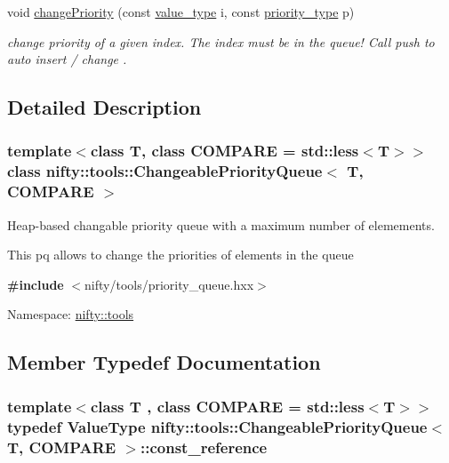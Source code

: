 \begin{DoxyCompactItemize}
void \hyperlink{classnifty_1_1tools_1_1ChangeablePriorityQueue_a5db5d4bd2d451623897e27c1aa5f8fff}{change\+Priority} (const \hyperlink{classnifty_1_1tools_1_1ChangeablePriorityQueue_aa00fbc748b94bdc6175b4c49bb2bba48}{value\+\_\+type} i, const \hyperlink{classnifty_1_1tools_1_1ChangeablePriorityQueue_a6ecafb387f99a1cfa7ff5795c924682c}{priority\+\_\+type} p)
\begin{DoxyCompactList}\small\item\em change priority of a given index. The index must be in the queue! Call push to auto insert / change . \end{DoxyCompactList}\end{DoxyCompactItemize}


\subsection{Detailed Description}
\subsubsection*{template$<$class T, class C\+O\+M\+P\+A\+R\+E = std\+::less$<$\+T$>$$>$class nifty\+::tools\+::\+Changeable\+Priority\+Queue$<$ T, C\+O\+M\+P\+A\+R\+E $>$}

Heap-\/based changable priority queue with a maximum number of elemements. 

This pq allows to change the priorities of elements in the queue

{\bfseries \#include} $<$nifty/tools/priority\+\_\+queue.\+hxx$>$~\newline


Namespace\+: \hyperlink{namespacenifty_1_1tools}{nifty\+::tools} 

\subsection{Member Typedef Documentation}
\hypertarget{classnifty_1_1tools_1_1ChangeablePriorityQueue_acb7eb23bd9ca7c52955adc06bf4816c3}{}
\subsubsection[{const\+\_\+reference}]{\setlength{\rightskip}{0pt plus 5cm}template$<$class T , class C\+O\+M\+P\+A\+R\+E  = std\+::less$<$\+T$>$$>$ typedef {\bf Value\+Type} {\bf nifty\+::tools\+::\+Changeable\+Priority\+Queue}$<$ T, C\+O\+M\+P\+A\+R\+E $>$\+::{\bf const\+\_\+reference}}\label{classnifty_1_1tools_1_1ChangeablePriorityQueue_acb7eb23bd9ca7c52955adc06bf4816c3}
\hypertarget{classnifty_1_1tools_1_1ChangeablePriorityQueue_a6ecafb387f99a1cfa7ff5795c924682c}{}

